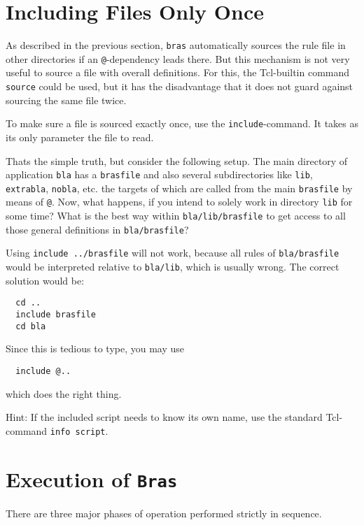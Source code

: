\documentclass[12pt]{article}
\newcommand{\bras}{\texttt{bras}}
\newcommand{\Bras}{\texttt{Bras}}
\begin{document}
\section{Including Files Only Once}

As described in the previous section, \bras{} automatically sources
the rule file in other directories if an \texttt{@}-dependency leads
there. But this mechanism is not very useful to source a file with
overall definitions. For this, the Tcl-builtin command
\texttt{source} could be used, but it has the disadvantage that it
does not guard against sourcing the same file twice.

To make sure a file is sourced exactly once, use the
\texttt{include}-command. It takes as its only parameter the file to
read. 

Thats the simple truth, but consider the following setup. The main
directory of application \texttt{bla} has a \texttt{brasfile} and also
several subdirectories like \texttt{lib}, \texttt{extrabla},
\texttt{nobla}, etc. the targets of which are called from the main
\texttt{brasfile} by means of \texttt{@}. Now, what happens,
if you intend to solely work in directory \texttt{lib} for some time?
What is the best way within \texttt{bla/lib/brasfile} to get access to all
those general definitions in \texttt{bla/brasfile}?

Using \texttt{include ../brasfile} will not work, because all
rules of \texttt{bla/brasfile} would be interpreted relative to
\texttt{bla/lib}, which is usually wrong. The correct solution would
be:
\begin{verbatim}
  cd ..
  include brasfile
  cd bla
\end{verbatim}
Since this is tedious to type, you may use
\begin{verbatim}
  include @..
\end{verbatim}
which does the right thing.

Hint: If the included script needs to know its own name, use the
standard Tcl-command \texttt{info script}.

\section{Execution of \Bras}

There are three major phases of operation performed strictly in
sequence.
\end{document}
